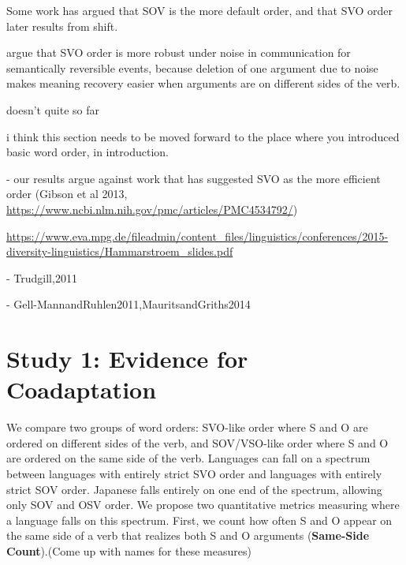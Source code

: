 \documentclass[11pt,a4paper]{article}
\newcommand{\key}[1]{\textbf{#1}}
\newcommand\mhahn[1]{{\color{red}(#1)}}
\begin{document}
Some work has argued that SOV is the more default order, and that SVO order later results from shift.

\cite{gibson-noisy-channel-2013} argue that SVO order is more robust under noise in communication for semantically reversible events, because deletion of one argument due to noise makes meaning recovery easier when arguments are on different sides of the verb.

\citep{maurits2014tracing} doesn't quite so far




{\color{blue}i think this section needs to be moved forward to the place where you introduced basic word order, in introduction.}

- our results argue against work that has suggested SVO as the more efficient order (Gibson et al 2013, \url{https://www.ncbi.nlm.nih.gov/pmc/articles/PMC4534792/})

\url{https://www.eva.mpg.de/fileadmin/content_files/linguistics/conferences/2015-diversity-linguistics/Hammarstroem_slides.pdf}

- Trudgill,2011

- Gell-MannandRuhlen2011,MauritsandGriths2014

\section{Study 1: Evidence for Coadaptation}

We compare two groups of word orders: SVO-like order where S and O are ordered on different sides of the verb, and SOV/VSO-like order where S and O are ordered on the same side of the verb.
Languages can fall on a spectrum between languages with entirely strict SVO order and languages with entirely strict SOV order.
Japanese falls entirely on one end of the spectrum, allowing only SOV and OSV order.
We propose two quantitative metrics measuring where a language falls on this spectrum.
First, we count how often S and O appear on the same side of a verb that realizes both S and O arguments (\key{Same-Side Count}).\mhahn{Come up with names for these measures}
\end{document}
